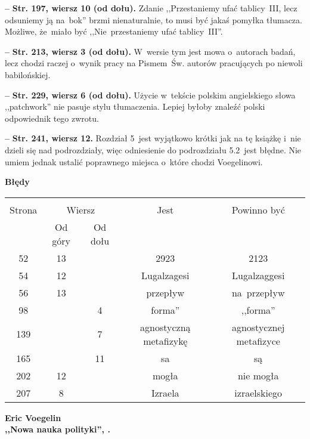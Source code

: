 \documentclass[a4paper,11pt]{article}
\newcommand{\spaceOne}{2em}
\newcommand{\tb}{\textbf}
\newcommand{\noi}{\noindent}
\newcommand{\start}{\noi \tb{--} {}}
\newcommand{\Center}[1]{\begin{center} #1 \end{center}}
\newcommand{\CenterTB}[1]{\Center{\tb{#1}}}
\newcommand{\StrWg}[2]{\tb{Str. #1, wiersz #2.}}
\newcommand{\StrWd}[2]{\tb{Str. #1, wiersz #2 (od dołu).}}
\newcommand{\Work}[1]{ \begin{center} {\large \tb{#1}} \end{center} }
\begin{document}
\start \StrWd{197}{10} Zdanie ,,Przestaniemy ufać tablicy~III, lecz
odsuniemy ją na~bok'' brzmi nienaturalnie, to musi być jakaś pomyłka
tłumacza. Możliwe, że~miało być ,,Nie~przestaniemy ufać tablicy~III''.


\start \StrWd{213}{3} W~wersie tym jest mowa o~autorach badań, lecz
chodzi raczej o~wynik pracy na Pismem~Św. autorów pracujących po
niewoli babilońskiej.


\start \StrWd{229}{6} Użycie w~tekście polskim angielskiego słowa
,,patchwork'' nie pasuje stylu tłumaczenia. Lepiej byłoby znaleźć
polski odpowiednik tego zwrotu.


\start \StrWg{241}{12} Rozdział 5~jest wyjątkowo krótki jak na tę
książkę i~nie dzieli się nad podrozdziały, więc odniesienie do
podrozdziału 5.2~jest błędne. Nie umiem jednak ustalić poprawnego
miejsca o~które chodzi Voegelinowi.

\CenterTB{Błędy}
\begin{center}
  \begin{tabular}{|c|c|c|c|c|}
    \hline
    & \multicolumn{2}{c|}{} & & \\
    Strona & \multicolumn{2}{c|}{Wiersz}& Jest & Powinno być \\ \cline{2-3}
    & Od góry & Od dołu &  &  \\ \hline
    52 & 13 & & 2923 & 2123 \\
    54 & 12 & & Lugalzagesi & Lugalzaggesi \\
    56 & 13 & & przepływ & na~przepływ \\
    98 & & 4 & forma'' & ,,forma'' \\
    139 & & 7 & agnostyczną metafizykę & agnostycznej metafizyce \\
    165 & & 11 & sa & są \\
    202 & 12 & & mogła & nie mogła \\
    207 & 8 & & Izraela & izraelskiego \\
    \hline
  \end{tabular}
\end{center}

\vspace{\spaceOne}



\Work{ Eric Voegelin \\
  ,,Nowa nauka polityki'', \cite{Voe92}.}
\end{document}
